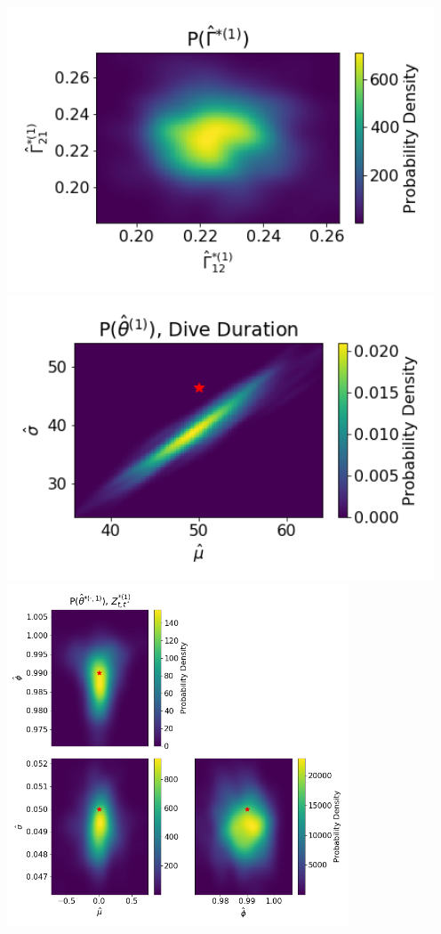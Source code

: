 \documentclass[12pt]{TD-CJS}
\begin{document}
\centering
\includegraphics[width=5in]{../Plots/hmm_FV_Gamma_density_0.png}
\includegraphics[width=5in]{../Plots/hmm_FV_MLE_density_dive_duration_-1_0.png}
\includegraphics[height=4in]{../Plots/hmm_FV_MLE_density_A_0_0.png}
\end{document}
